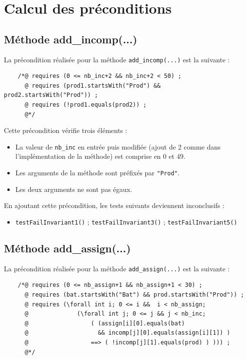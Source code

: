 \documentclass{article}
\begin{document}
\newpage

\section{Calcul des préconditions}

\subsection{Méthode add\_incomp(...)}

La précondition réalisée pour la méthode \texttt{add\_incomp(...)} est la suivante :
\vspace{0.3cm}

\noindent
\begin{verbatim}
    /*@ requires (0 <= nb_inc+2 && nb_inc+2 < 50) ;
      @ requires (prod1.startsWith("Prod") && prod2.startsWith("Prod")) ; 
      @ requires (!prod1.equals(prod2)) ;
      @*/
\end{verbatim}

\noindent
Cette précondition vérifie trois éléments :
\begin{itemize}
\item La valeur de \texttt{nb\_inc} en entrée puis modifiée (ajout de 2 comme dans l'implémentation de la méthode) est comprise en 0 et 49.
\item Les arguments de la méthode sont préfixés par \texttt{"Prod"}.
\item Les deux arguments ne sont pas égaux.
\end{itemize}

\vspace{0.3cm}
\noindent
En ajoutant cette précondition, les tests suivants deviennent inconclusifs :
\begin{itemize}
\renewcommand{\labelitemi}{$\rightarrow$} 
\item \texttt{testFailInvariant1()} ; \texttt{testFailInvariant3()} ; \texttt{testFailInvariant5()}
\end{itemize}

\subsection{Méthode add\_assign(...)}

La précondition réalisée pour la méthode \texttt{add\_assign(...)} est la suivante :
\vspace{0.3cm}

\noindent
\begin{verbatim}
    /*@ requires (0 <= nb_assign+1 && nb_assign+1 < 30) ;
      @ requires (bat.startsWith("Bat") && prod.startsWith("Prod")) ;
      @ requires (\forall int i; 0 <= i &&  i < nb_assign;
      @	             (\forall int j; 0 <= j && j < nb_inc;
      @	                 ( (assign[i][0].equals(bat)
      @                    && incomp[j][0].equals(assign[i][1]) )
      @	                 ==> ( !incomp[j][1].equals(prod) ) ))) ;
      @*/
\end{verbatim}
\vspace{0.2cm}
\end{document}
